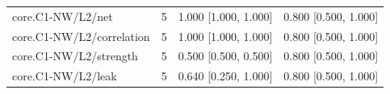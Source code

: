 \begin{longtable}{@{}p{1.9in}rl l@{}}
core.\allowbreak C1-NW/\allowbreak L2/\allowbreak net & 5 & 1.000 [1.000, 1.000] & 0.800 [0.500, 1.000]\\
core.\allowbreak C1-NW/\allowbreak L2/\allowbreak correlation & 5 & 1.000 [1.000, 1.000] & 0.800 [0.500, 1.000]\\
core.\allowbreak C1-NW/\allowbreak L2/\allowbreak strength & 5 & 0.500 [0.500, 0.500] & 0.800 [0.500, 1.000]\\
core.\allowbreak C1-NW/\allowbreak L2/\allowbreak leak & 5 & 0.640 [0.250, 1.000] & 0.800 [0.500, 1.000]\\
\end{longtable}\endgroup
\begingroup\footnotesize\setlength{\tabcolsep}{3pt}

